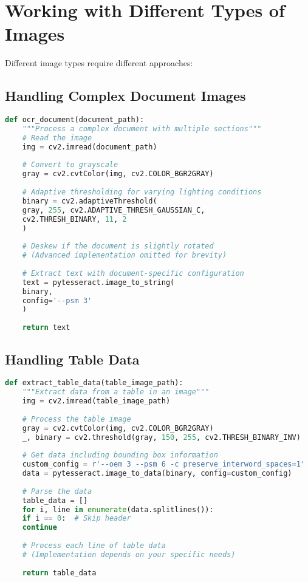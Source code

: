 \section{Working with Different Types of Images}
Different image types require different approaches:

\subsection{Handling Complex Document Images}
\begin{lstlisting}[language=Python]
	def ocr_document(document_path):
	"""Process a complex document with multiple sections"""
	# Read the image
	img = cv2.imread(document_path)
	
	# Convert to grayscale
	gray = cv2.cvtColor(img, cv2.COLOR_BGR2GRAY)
	
	# Adaptive thresholding for varying lighting conditions
	binary = cv2.adaptiveThreshold(
	gray, 255, cv2.ADAPTIVE_THRESH_GAUSSIAN_C, 
	cv2.THRESH_BINARY, 11, 2
	)
	
	# Deskew if the document is slightly rotated
	# (Advanced implementation omitted for brevity)
	
	# Extract text with document-specific configuration
	text = pytesseract.image_to_string(
	binary, 
	config='--psm 3'
	)
	
	return text
\end{lstlisting}

\subsection{Handling Table Data}
\begin{lstlisting}[language=Python]
	def extract_table_data(table_image_path):
	"""Extract data from a table in an image"""
	img = cv2.imread(table_image_path)
	
	# Process the table image
	gray = cv2.cvtColor(img, cv2.COLOR_BGR2GRAY)
	_, binary = cv2.threshold(gray, 150, 255, cv2.THRESH_BINARY_INV)
	
	# Get data including bounding box information
	custom_config = r'--oem 3 --psm 6 -c preserve_interword_spaces=1'
	data = pytesseract.image_to_data(binary, config=custom_config)
	
	# Parse the data
	table_data = []
	for i, line in enumerate(data.splitlines()):
	if i == 0:  # Skip header
	continue
	
	# Process each line of table data
	# (Implementation depends on your specific needs)
	
	return table_data
\end{lstlisting}

